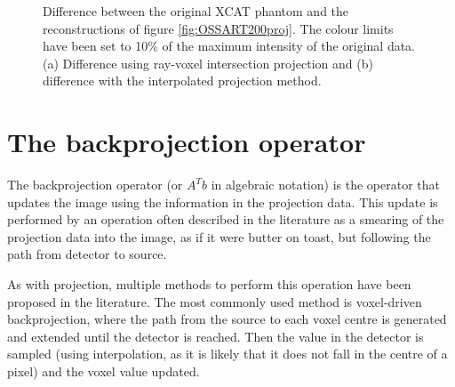 \begin{figure}
\centering
{}

\caption[Difference in reconstruction using different projection operators]{\label{fig:OSSART200projdiff} Difference between the original XCAT phantom and the reconstructions of figure \ref{fig:OSSART200proj}. The colour limits have been set to 10\% of the maximum intensity of the original data.  (a) Difference using ray-voxel intersection projection and (b) difference with the interpolated projection method.} 
\end{figure}



\FloatBarrier

\section{The backprojection operator}

The backprojection operator (or $A^Tb$ in algebraic notation) is the operator that updates the image using the information in the projection data. This update is performed by an operation often described in the literature as a smearing of the projection data into the image, as if it were butter on toast, but following the path from detector to source.

As with projection, multiple methods to perform this operation have been proposed in the literature. The most commonly used method is voxel-driven backprojection\cite{scherl2007fast}\cite{okitsu2010high}, where the path from the source to each voxel centre is generated and extended until the detector is reached. Then the value in the detector is sampled (using interpolation, as it is likely that it does not fall in the centre of a pixel) and the voxel value updated.
 
